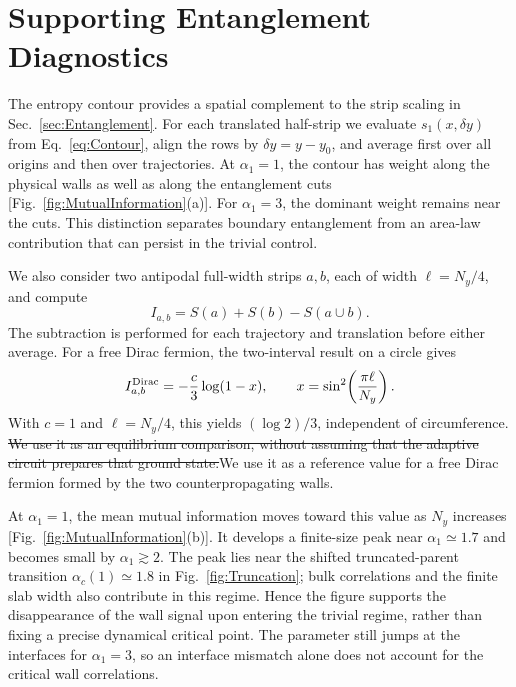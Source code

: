 \documentclass[aps,prb,10pt,twocolumn,superscriptaddress,longbibliography,floatfix]{revtex4-2}
\newcommand{\claudeadd}[1]{{\color{orange}#1}}
\newcommand{\claudedel}[1]{{\color{orange}\sout{#1}}}
\begin{document}
{\color{blue}
\section{Supporting Entanglement Diagnostics}
\label{app:MutualInformation}

The entropy contour provides a spatial complement to the strip scaling in Sec.~\ref{sec:Entanglement}. For each translated half-strip we evaluate $s_1(x,\delta y)$ from Eq.~\eqref{eq:Contour}, align the rows by $\delta y=y-y_0$, and average first over all origins and then over trajectories. At $\alpha_1=1$, the contour has weight along the physical walls as well as along the entanglement cuts [Fig.~\ref{fig:MutualInformation}(a)]. For $\alpha_1=3$, the dominant weight remains near the cuts. This distinction separates boundary entanglement from an area-law contribution that can persist in the trivial control.

We also consider two antipodal full-width strips $a,b$, each of width $\ell=N_y/4$, and compute
\begin{equation}
 I_{a,b}=S(a)+S(b)-S(a\cup b).
 \label{eq:MutualInformation}
\end{equation}
The subtraction is performed for each trajectory and translation before either average. For a free Dirac fermion, the two-interval result on a circle gives~\cite{CasiniHuerta2009,CalabreseCardyTonni2009}
\begin{equation}
 I^{\rm Dirac}_{a,b}=-\frac{c}{3}\log(1-x),\qquad
 x=\sin^2\!\left(\frac{\pi\ell}{N_y}\right).
 \label{eq:DiracMI}
\end{equation}
With $c=1$ and $\ell=N_y/4$, this yields $(\log2)/3$, independent of circumference. \claudedel{We use it as an equilibrium comparison, without assuming that the adaptive circuit prepares that ground state.}\claudeadd{We use it as a reference value for a free Dirac fermion formed by the two counterpropagating walls.}

At $\alpha_1=1$, the mean mutual information moves toward this value as $N_y$ increases [Fig.~\ref{fig:MutualInformation}(b)]. It develops a finite-size peak near $\alpha_1\simeq1.7$ and becomes small by $\alpha_1\gtrsim2$. The peak lies near the shifted truncated-parent transition $\alpha_c(1)\simeq1.8$ in Fig.~\ref{fig:Truncation}; bulk correlations and the finite slab width also contribute in this regime. Hence the figure supports the disappearance of the wall signal upon entering the trivial regime, rather than fixing a precise dynamical critical point. The parameter still jumps at the interfaces for $\alpha_1=3$, so an interface mismatch alone does not account for the critical wall correlations.
}
\end{document}
